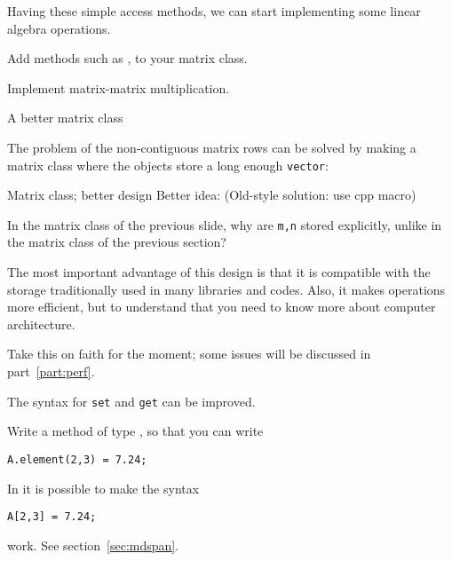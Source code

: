 Having these simple access methods, we can start implementing
some linear algebra operations.

\begin{exercise}
  \label{ex:matrix-methods}
  Add methods such as ,  to your matrix class.

  Implement matrix-matrix multiplication.
\end{exercise}

 {A better matrix class}

The problem of the non-contiguous matrix rows can be solved 
by making a matrix class where the objects store a long enough \lstinline{vector}:
%

\begin{slide}{Matrix class; better design}
  \label{sl:matrix-class-cont}
  Better idea:
(Old-style solution: use cpp macro)
\end{slide}

\begin{exercise}
  \label{ex:matrixclass-rowcol2}
  In the matrix class of the previous slide,
  why are \lstinline{m,n} stored explicitly,
  unlike in the matrix class of the previous section?
\end{exercise}

The most important advantage of this design is that it is compatible with
the storage traditionally used in 
many libraries and codes.
Also, it makes operations more efficient, but to understand that
you need to know more about computer architecture.
\begin{packt}
  Take this on faith for the moment; some issues will be discussed in part~\ref{part:perf}.
\end{packt}

The syntax for \lstinline{set} and \lstinline{get} can be improved.
\begin{exercise}
  Write a method  of type , so that you can write
\begin{lstlisting}
A.element(2,3) = 7.24;
\end{lstlisting}
\end{exercise}

\begin{remark}
  In  it is possible to make the syntax
\begin{lstlisting}
A[2,3] = 7.24;
\end{lstlisting}
work. See section~\ref{sec:mdspan}.
\end{remark}

